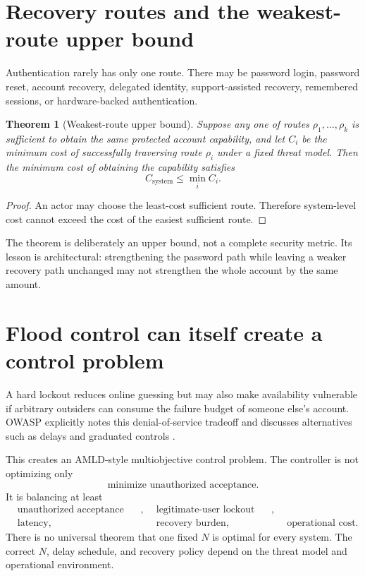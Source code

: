 \documentclass[11pt,openany]{book}
\newtheorem{theorem}{Theorem}[chapter]
\theoremstyle{definition}
\theoremstyle{remark}
\begin{document}
\section{Recovery routes and the weakest-route upper bound}
Authentication rarely has only one route. There may be password login, password reset, account recovery, delegated identity, support-assisted recovery, remembered sessions, or hardware-backed authentication.

\begin{theorem}[Weakest-route upper bound]\label{thm:weakroute}
Suppose any one of routes $\rho_1,\ldots,\rho_k$ is sufficient to obtain the same protected account capability, and let $C_i$ be the minimum cost of successfully traversing route $\rho_i$ under a fixed threat model. Then the minimum cost of obtaining the capability satisfies
\[
C_{\mathrm{system}}\le \min_i C_i.
\]
\end{theorem}
\begin{proof}
An actor may choose the least-cost sufficient route. Therefore system-level cost cannot exceed the cost of the easiest sufficient route.
\end{proof}

The theorem is deliberately an upper bound, not a complete security metric. Its lesson is architectural: strengthening the password path while leaving a weaker recovery path unchanged may not strengthen the whole account by the same amount.

\section{Flood control can itself create a control problem}
A hard lockout reduces online guessing but may also make availability vulnerable if arbitrary outsiders can consume the failure budget of someone else's account. OWASP explicitly notes this denial-of-service tradeoff and discusses alternatives such as delays and graduated controls \cite{OWASPAuth}.

This creates an AMLD-style multiobjective control problem. The controller is not optimizing only
\[
\text{minimize unauthorized acceptance}.
\]
It is balancing at least
\[
\begin{aligned}
&\text{unauthorized acceptance risk}, &&\text{legitimate-user lockout risk},\\
&\text{latency}, &&\text{recovery burden}, &&\text{operational cost}.
\end{aligned}
\]
There is no universal theorem that one fixed $N$ is optimal for every system. The correct $N$, delay schedule, and recovery policy depend on the threat model and operational environment.
\end{document}
